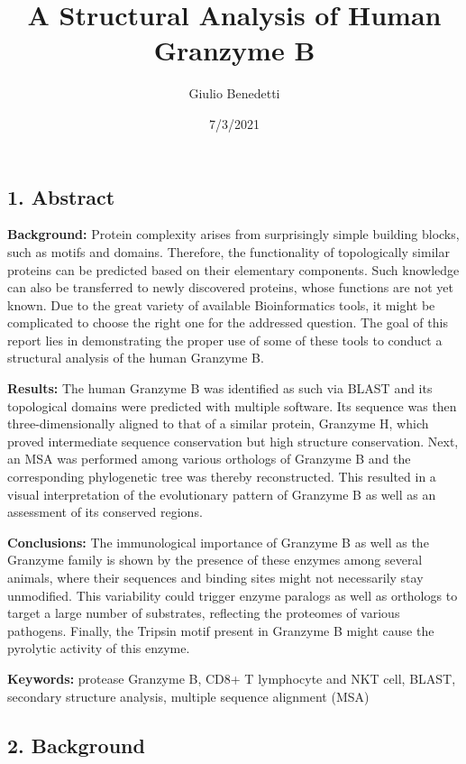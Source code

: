 \documentclass[
]{article}
\title{A Structural Analysis of Human Granzyme B}
\author{Giulio Benedetti}
\date{7/3/2021}
\begin{document}
\maketitle

{
\setcounter{tocdepth}{2}
\tableofcontents
}
\hypertarget{abstract}{%
\subsection*{1. Abstract}\label{abstract}}

\textbf{Background:} Protein complexity arises from surprisingly simple building blocks, such as motifs and domains. Therefore, the functionality of topologically similar proteins can be predicted based on their elementary components. Such knowledge can also be transferred to newly discovered proteins, whose functions are not yet known. Due to the great variety of available Bioinformatics tools, it might be complicated to choose the right one for the addressed question. The goal of this report lies in demonstrating the proper use of some of these tools to conduct a structural analysis of the human Granzyme B.

\textbf{Results:} The human Granzyme B was identified as such via BLAST and its topological domains were predicted with multiple software. Its sequence was then three-dimensionally aligned to that of a similar protein, Granzyme H, which proved intermediate sequence conservation but high structure conservation. Next, an MSA was performed among various orthologs of Granzyme B and the corresponding phylogenetic tree was thereby reconstructed. This resulted in a visual interpretation of the evolutionary pattern of Granzyme B as well as an assessment of its conserved regions.

\textbf{Conclusions:} The immunological importance of Granzyme B as well as the Granzyme family is shown by the presence of these enzymes among several animals, where their sequences and binding sites might not necessarily stay unmodified. This variability could trigger enzyme paralogs as well as orthologs to target a large number of substrates, reflecting the proteomes of various pathogens. Finally, the Tripsin motif present in Granzyme B might cause the pyrolytic activity of this enzyme.

\textbf{Keywords:} protease Granzyme B, CD8+ T lymphocyte and NKT cell, BLAST, secondary structure analysis, multiple sequence alignment (MSA)

\hypertarget{background}{%
\subsection*{2. Background}\label{background}}
\end{document}
